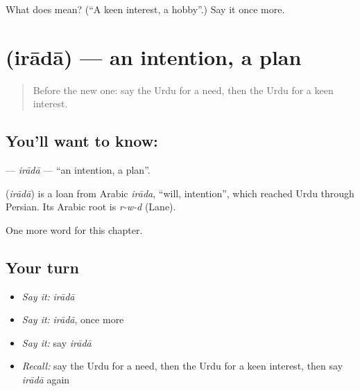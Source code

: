 \begin{tcolorbox}[breakable,colback=teal!4,colframe=teal!35!black,title={Before you move on}]
What does  mean? (\textquotedblleft{}A keen interest, a hobby\textquotedblright{}.) Say it once more.
\end{tcolorbox}
\section[\texorpdfstring{\ur{ارادہ} (irādā)}{ارادہ (irādā)}]{ (irādā) — an intention, a plan}

\label{lesson:UR-C105-irada}



\begin{quote}
Before the new one: say the Urdu for a need, then the Urdu for a keen interest.
\end{quote}

\subsection*{You'll want to know: }
\textbf{} — \emph{irādā} — \textquotedblleft{}an intention, a plan\textquotedblright{}.

\begin{cousinweb}
\textbf{} (\emph{irādā}) is a loan from Arabic \emph{irāda}, \textquotedblleft{}will, intention\textquotedblright{}, which reached Urdu through Persian. Its Arabic root is \emph{r-w-d} (Lane).
\end{cousinweb}

\begin{grammarlens}[title={What you've built}]
One more word for this chapter.
\end{grammarlens}

\subsection*{Your turn}
\begin{itemize}
\raggedright
  \item \emph{Say it:} \emph{irādā}
  \item \emph{Say it:} \emph{irādā}, once more
  \item \emph{Say it:} say \emph{irādā}
  \item \emph{Recall:} say the Urdu for a need, then the Urdu for a keen interest, then say \emph{irādā} again
\end{itemize}

